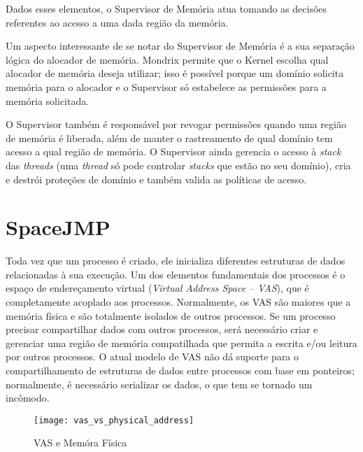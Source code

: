 Dados esses elementos, o Supervisor de Memória atua tomando as decisões
referentes ao acesso a uma dada região da memória.

Um aspecto interessante de se notar do Supervisor de Memória é a sua separação
lógica do alocador de memória. Mondrix permite que o Kernel escolha qual
alocador de memória deseja utilizar; isso é possível porque um domínio solicita
memória para o alocador e o Supervisor só estabelece as permissões para a
memória solicitada.

O Supervisor também é responsável por revogar permissões quando uma região de
memória é liberada, além de manter o rastreamento de qual domínio tem acesso a
qual região de memória. O Supervisor ainda gerencia o acesso à \emph{stack}
das \emph{threads} (uma \emph{thread} só pode controlar \emph{stacks} que estão
no seu domínio), cria e destrói proteções de domínio e também valida as
políticas de acesso.

\section{SpaceJMP}
\label{sec:mvas}

Toda vez que um processo é criado, ele inicializa diferentes estruturas de
dados relacionadas à sua execução. Um dos elementos fundamentais dos processos
é o espaço de endereçamento virtual (\emph{Virtual Address Space -- VAS}), que é
completamente acoplado aos processos. Normalmente, os VAS são maiores que a
memória física e são totalmente isolados de outros processos. Se um processo
precisar compartilhar dados com outros processos, será necessário criar e
gerenciar uma região de memória compatilhada que permita a escrita e/ou leitura
por outros processos. O atual modelo de VAS não dá suporte para
o compartilhamento de estruturas de dados entre processos com base em ponteiros;
normalmente, é necessário serializar os dados, o que tem se tornado um incômodo.

\begin{figure}[!h]
  \centering
  \texttt{[image: vas\_vs\_physical\_address]} 
  \caption{VAS e Memóra Física}
  \label{fig:vas_vs_physical} 
\end{figure}

